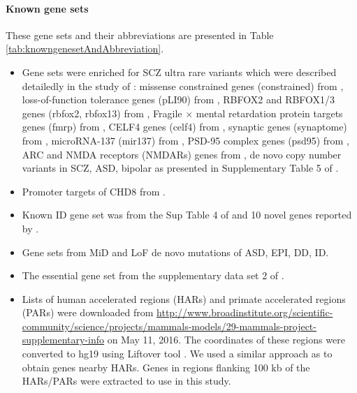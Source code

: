 \documentclass[]{article}
\begin{document}
\paragraph{Known gene sets}

These gene sets and their abbreviations are presented in Table \ref{tab:knowngenesetAndAbbreviation}.

\begin{itemize}
\item Gene sets were enriched for SCZ ultra rare variants which were
  described detailedly in the study
  of  \cite{genovese2016increased}: missense constrained genes
  (constrained) from \cite{samocha2014framework},
loss-of-function tolerance genes (pLI90) from \cite{lek2015analysis},
RBFOX2 and RBFOX1/3 genes (rbfox2, rbfox13) from \cite{weyn2014hits},
Fragile × mental retardation protein targets genes (fmrp) from \cite{darnell2011fmrp},
CELF4 genes (celf4) from \cite{wagnon2012celf4},
synaptic genes (synaptome) from \cite{pirooznia2012synaptomedb},
microRNA-137 (mir137) from \cite{robinson2015genetic},
PSD-95 complex genes (psd95) from \cite{bayes2011characterization},
ARC and NMDA   receptors (NMDARs) genes from \cite{kirov2012novo},
de novo copy number variants in SCZ, ASD, bipolar as presented in Supplementary
Table 5 of \cite{genovese2016increased}.

\item Promoter targets of CHD8 from \cite{cotney2015autism}.

\item Known ID gene set was from the Sup Table 4 of  \cite{lelieveld2016meta}
   and 10 novel genes reported by  \cite{lelieveld2016meta}.

\item Gene sets from MiD and LoF de novo mutations of ASD, EPI, DD, ID.

\item The essential gene set from the supplementary data set 2 of
  \cite{ji2016increased}.

\item Lists of human accelerated regions (HARs) and primate accelerated regions (PARs) \citep{lindblad2011high} were downloaded from \url{http://www.broadinstitute.org/scientific-community/science/projects/mammals-models/29-mammals-project-supplementary-info} on May 11, 2016. The coordinates of these regions were converted to hg19 using Liftover tool \citep{kent2002human}. We used a similar approach as \cite{xu2015genomic} to obtain genes nearby HARs. Genes in regions flanking 100 kb of the HARs/PARs were extracted to use in this study.

\end{itemize}
\end{document}
